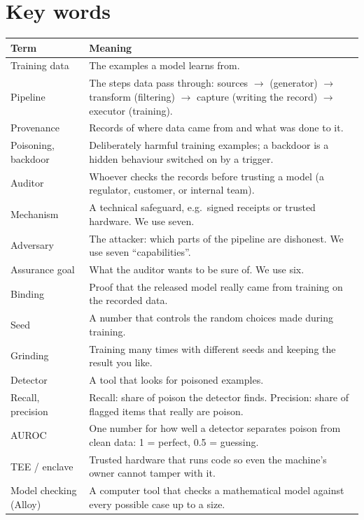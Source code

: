 \section{Key words}
\begin{center}\small
\begin{tabularx}{\textwidth}{@{}l>{\raggedright\arraybackslash}X@{}}
\toprule
Term & Meaning\\
\midrule
Training data & The examples a model learns from.\\
Pipeline & The steps data pass through: sources $\to$ (generator) $\to$ transform (filtering) $\to$ capture (writing the record) $\to$ executor (training).\\
Provenance & Records of where data came from and what was done to it.\\
Poisoning, backdoor & Deliberately harmful training examples; a backdoor is a hidden behaviour switched on by a trigger.\\
Auditor & Whoever checks the records before trusting a model (a regulator, customer, or internal team).\\
Mechanism & A technical safeguard, e.g.\ signed receipts or trusted hardware. We use seven.\\
Adversary & The attacker: which parts of the pipeline are dishonest. We use seven ``capabilities''.\\
Assurance goal & What the auditor wants to be sure of. We use six.\\
Binding & Proof that the released model really came from training on the recorded data.\\
Seed & A number that controls the random choices made during training.\\
Grinding & Training many times with different seeds and keeping the result you like.\\
Detector & A tool that looks for poisoned examples.\\
Recall, precision & Recall: share of poison the detector finds. Precision: share of flagged items that really are poison.\\
AUROC & One number for how well a detector separates poison from clean data: 1 = perfect, 0.5 = guessing.\\
TEE / enclave & Trusted hardware that runs code so even the machine's owner cannot tamper with it.\\
Model checking (Alloy) & A computer tool that checks a mathematical model against every possible case up to a size.\\
\bottomrule
\end{tabularx}
\end{center}

